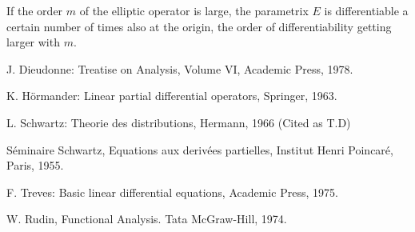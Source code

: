 \begin{remark*}
If the order $m$ of the elliptic operator is large, the parametrix $E$ is differentiable a certain number of times also at the origin, the order of differentiability getting larger with $m$.
\end{remark*}

\begin{thebibliography}{99}\pageoriginale
{} J. Dieudonne: Treatise on Analysis, Volume VI, Academic Press, 1978.

 K. H\"ormander: Linear partial differential operators, Springer, 1963.

 L. Schwartz: Theorie des distributions, Hermann, 1966 (Cited as T.D)

 S\'eminaire Schwartz, Equations aux deriv\'ees partielles, Institut Henri Poincar\'e, Paris, 1955.

 F. Treves: Basic linear differential equations, Academic Press, 1975.

 W. Rudin, Functional Analysis. Tata McGraw-Hill, 1974.
\end{thebibliography}
